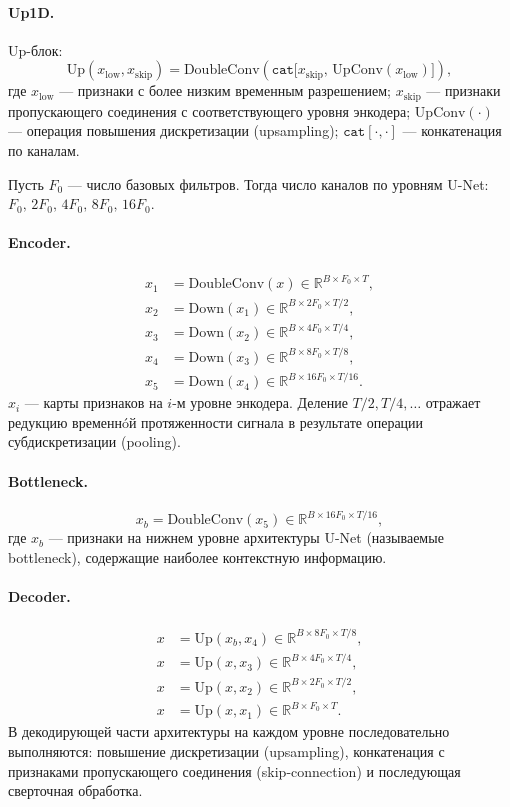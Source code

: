 \documentclass[10pt,a4paper]{book}
\begin{document}
\paragraph{Up1D.}
Up-блок:
\[
\text{Up}(x_{\text{low}}, x_{\text{skip}}) =
\text{DoubleConv}\left(\texttt{cat}\big[x_{\text{skip}},\, \text{UpConv}(x_{\text{low}})\big]\right),
\]
где $x_{\text{low}}$ --- признаки с более низким временным разрешением; $x_{\text{skip}}$ --- признаки пропускающего соединения с соответствующего уровня энкодера; $\text{UpConv}(\cdot)$ --- операция повышения дискретизации (upsampling); $\texttt{cat}[\cdot,\cdot]$ --- конкатенация по каналам.

Пусть $F_0$ --- число базовых фильтров. Тогда число каналов по уровням U-Net: $F_0,\,2F_0,\,4F_0,\,8F_0,\,16F_0$.

\paragraph{Encoder.}
\begin{align*}
x_1 &= \text{DoubleConv}(x) \in \mathbb{R}^{B \times F_0 \times T},\\
x_2 &= \text{Down}(x_1) \in \mathbb{R}^{B \times 2F_0 \times T/2},\\
x_3 &= \text{Down}(x_2) \in \mathbb{R}^{B \times 4F_0 \times T/4},\\
x_4 &= \text{Down}(x_3) \in \mathbb{R}^{B \times 8F_0 \times T/8},\\
x_5 &= \text{Down}(x_4) \in \mathbb{R}^{B \times 16F_0 \times T/16}.
\end{align*}
$x_i$ --- карты признаков на $i$-м уровне энкодера. Деление $T/2, T/4, \dots$ отражает редукцию временнóй протяженности сигнала в результате операции субдискретизации (pooling).

\paragraph{Bottleneck.}
\[
x_b = \text{DoubleConv}(x_5) \in \mathbb{R}^{B \times 16F_0 \times T/16},
\]
где $x_b$ --- признаки на нижнем уровне архитектуры U-Net (называемые bottleneck), содержащие наиболее контекстную информацию.

\paragraph{Decoder.}
\begin{align*}
x &= \text{Up}(x_b, x_4) \in \mathbb{R}^{B \times 8F_0 \times T/8},\\
x &= \text{Up}(x, x_3) \in \mathbb{R}^{B \times 4F_0 \times T/4},\\
x &= \text{Up}(x, x_2) \in \mathbb{R}^{B \times 2F_0 \times T/2},\\
x &= \text{Up}(x, x_1) \in \mathbb{R}^{B \times F_0 \times T}.
\end{align*}
В декодирующей части архитектуры на каждом уровне последовательно выполняются: повышение дискретизации (upsampling), конкатенация с признаками пропускающего соединения (skip-connection) и последующая сверточная обработка.
\end{document}
